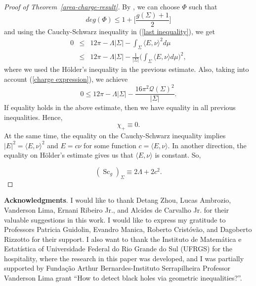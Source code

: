\documentclass[a4paper, 11pt, reqno]{amsart}
\newcommand{\s}{\operatorname{Sc}}
\begin{document}
\begin{proof}[Proof of Theorem~\ref{area-charge-result}]
By \cite{RR}, we can choose $\Phi$ such that
\begin{equation*}
    deg(\Phi)\leq 1+\Big[\frac{g(\Sigma)+1}{2}\Big]
\end{equation*}
and using the Cauchy-Schwarz inequality in (\ref{last inequality}), we get
\begin{eqnarray*}
    0&\leq& 12\pi-\Lambda|\Sigma|-\int_{\Sigma} \langle E, \nu\rangle^2d\mu \\
    &\leq& 12\pi -\Lambda |\Sigma|-\frac{1}{|\Sigma|}\Big(\int_{\Sigma} \langle E, \nu\rangle d\mu\Big)^2,
\end{eqnarray*}
where we used the H\"older's inequality in the previous estimate. Also, taking into account (\ref{charge expression}),
we achieve
\begin{equation*}
    0\leq 12\pi-\Lambda |\Sigma| -\frac{16\pi^2\mathcal{Q}(\Sigma)^2}{|\Sigma|}.
\end{equation*}
If equality holds in the above estimate, then we have equality in all previous inequalities. Hence,
\begin{equation*}
    \chi_+\equiv 0.
\end{equation*}
At the same time, the equality on the Cauchy-Schwarz inequality implies $|E|^2=\langle E, \nu\rangle^2$ and $E=c\nu$ for some function $c=\langle E, \nu\rangle$. In another direction, the equality on H\"older's estimate gives us that $\langle E, \nu\rangle$ is constant. So,

$$(\s_g)_{\Sigma}\equiv 2\Lambda+2c^2.$$

\end{proof}


 \noindent
{\bf Acknowledgments}. I would like to thank Detang Zhou, Lucas Ambrozio, Vanderson Lima, Ernani Ribeiro Jr., and  Alcides de Carvalho Jr. for their valuable suggestions in this work. I would like to express my gratitude to Professors Patricia Guidolin, Evandro Manica, Roberto Crist\'ov\~ao, and Dagoberto Rizzotto for their support. I also want to thank the Instituto de Matem\'atica e Estatística of Universidade Federal do Rio Grande do Sul (UFRGS) for the hospitality, where the research in this paper was developed, and I was partially supported by Funda\c c\~ao Arthur Bernardes-Instituto Serrapilheira Professor Vanderson Lima grant ``How to detect black holes via geometric inequalities?''.
\end{document}
